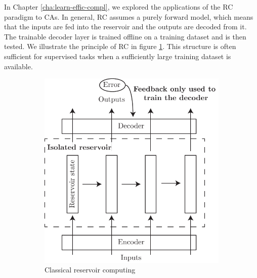In Chapter \ref{cha:learn-effic-compl}, we explored the applications of the
\acf{RC} paradigm to \acp{CA}. In general, \ac{RC} assumes a purely forward
model, which means that the inputs are fed into the reservoir and the outputs are decoded from
it. The trainable decoder layer is trained offline on a training dataset and
is then tested. We illustrate the  principle of \ac{RC} in figure
\ref{fig:classical_reservoir}. This structure is often sufficient for supervised
tasks when a sufficiently large training dataset is available.

\begin{figure}[htbp]
  \centering
  \begin{subfigure}[t]{.5\linewidth}
    \centering
    \includegraphics[width=\linewidth]{figures/classical_reservoir.pdf}
    \caption{Classical reservoir computing}
    \label{fig:classical_reservoir}
  \end{subfigure}
  \begin{subfigure}[t]{.45\linewidth}
    \centering

\end{subfigure}
\end{figure}
